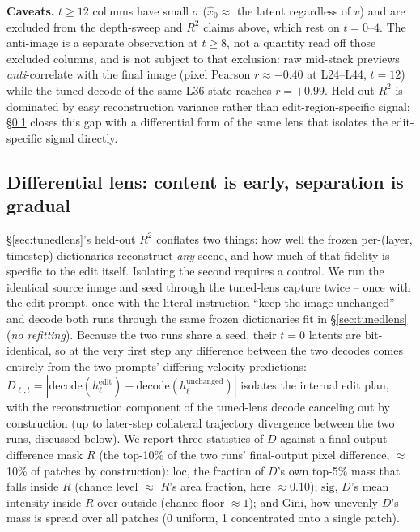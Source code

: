 \documentclass[10pt,twocolumn,letterpaper]{article}
\begin{document}
\textbf{Caveats.} $t{\ge}12$ columns have small $\sigma$ ($\hat x_0
\approx$ the latent regardless of $v$) and are excluded from the
depth-sweep and $R^2$ claims above, which rest on $t{=}0$--$4$. The
anti-image is a separate observation at $t{\ge}8$, not a quantity
read off those excluded columns, and is not subject to that
exclusion: raw mid-stack previews
\emph{anti}-correlate with the final image (pixel Pearson
$r\approx-0.40$ at L24--L44, $t{=}12$) while the tuned decode of the
same L36 state reaches $r=+0.99$. Held-out $R^2$ is dominated by easy
reconstruction variance rather than edit-region-specific signal;
\S\ref{sec:difflens} closes this gap with a differential form of the
same lens that isolates the edit-specific signal directly.

\subsection{Differential lens: content is early, separation is
gradual}\label{sec:difflens}

\S\ref{sec:tunedlens}'s held-out $R^2$ conflates two things: how well
the frozen per-(layer, timestep) dictionaries reconstruct \emph{any}
scene, and how much of that fidelity is specific to the edit itself.
Isolating the second requires a control. We run the identical source
image and seed through the tuned-lens capture twice -- once with the
edit prompt, once with the literal instruction ``keep the image
unchanged'' -- and decode both runs through the same frozen
dictionaries fit in \S\ref{sec:tunedlens} (\emph{no refitting}).
Because the two runs share a seed, their $t{=}0$ latents are
bit-identical, so at the very first step any difference between the
two decodes comes entirely from the two prompts' differing velocity
predictions: $D_{\ell,t} = |\text{decode}(h_\ell^{\text{edit}}) -
\text{decode}(h_\ell^{\text{unchanged}})|$ isolates the internal edit
plan, with the reconstruction component of the tuned-lens decode
canceling out by construction (up to later-step collateral trajectory
divergence between the two runs, discussed below). We report three
statistics of $D$ against a final-output difference mask $R$ (the
top-10\% of the two runs' final-output pixel difference,
$\approx$10\% of patches by construction): $\mathrm{loc}$, the fraction
of $D$'s own top-5\% mass that falls inside $R$ (chance level
$\approx$ $R$'s area fraction, here $\approx0.10$); $\mathrm{sig}$,
$D$'s mean intensity inside $R$ over outside (chance floor
$\approx1$); and Gini, how unevenly $D$'s mass is spread over all
patches (0 uniform, 1 concentrated onto a single patch).
\end{document}
